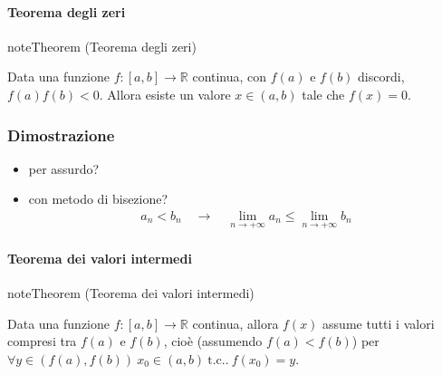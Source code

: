 \documentclass[letterpaper,10pt,italian]{jupyterBook}
\begin{document}
\paragraph{Teorema degli zeri}
\label{\detokenize{ch/infinitesimal_calculus/analysis:teorema-degli-zeri}}\label{\detokenize{ch/infinitesimal_calculus/analysis:infinitesimal-calculus-continuous-fun-thms-zeros}}\label{None:thm:infinitesimal-calculus:continuous-fun:thms:zeros}
\begin{sphinxadmonition}{note}{Theorem  (Teorema degli zeri)}



\sphinxAtStartPar
Data una funzione \(f: [a,b] \rightarrow \mathbb{R}\) continua, con \(f(a)\) e \(f(b)\) discordi, \(f(a) f(b) < 0\). Allora esiste un valore \(x \in (a,b)\) tale che \(f(x) = 0\).
\end{sphinxadmonition}
\subsubsection*{Dimostrazione}

\sphinxAtStartPar
{}
\begin{itemize}
\item {} 
\sphinxAtStartPar
per assurdo?

\item {} 
\sphinxAtStartPar
con metodo di bisezione? 
\begin{equation*}
\begin{split}a_n < b_n \quad \rightarrow \quad \lim_{n \rightarrow +\infty} a_n \le \lim_{n \rightarrow +\infty} b_n\end{split}
\end{equation*}
\end{itemize}


\paragraph{Teorema dei valori intermedi}
\label{\detokenize{ch/infinitesimal_calculus/analysis:teorema-dei-valori-intermedi}}\label{\detokenize{ch/infinitesimal_calculus/analysis:infinitesimal-calculus-continuous-fun-thms-intermediate}}\label{None:thm:infinitesimal-calculus:continuous-fun:thms:intermediate}
\begin{sphinxadmonition}{note}{Theorem  (Teorema dei valori intermedi)}



\sphinxAtStartPar
Data una funzione \(f: [a,b] \rightarrow \mathbb{R}\) continua, allora \(f(x)\) assume tutti i valori compresi tra \(f(a)\) e \(f(b)\), cioè (assumendo \(f(a) < f(b)\)) per \(\forall y \in (f(a), f(b)) \ x_0 \in (a,b) \ \text{t.c..} \ f(x_0) = y\).
\end{sphinxadmonition}
\end{document}
